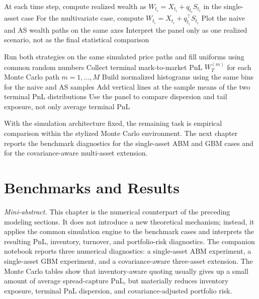 \documentclass[a4paper,10pt,titlepage,oneside,openany]{book}
\theoremstyle{plain}\newtheorem{theorem}{Theorem}[chapter]
\theoremstyle{definition}\newtheorem{definition}{Definition}[chapter]
\theoremstyle{remark}\newtheorem{remark}{Remark}[chapter]
\newcommand{\miniabstract}[1]{%
\vspace{-2pt}
\begin{tcolorbox}[colback=gray!6,colframe=black!15,boxrule=0.3pt,arc=3pt,left=6pt,right=6pt,top=4pt,bottom=4pt]
\textit{Mini-abstract.} #1
\end{tcolorbox}
\vspace{-4pt}
}
\begin{document}
\begin{algorithm}[H]
\caption{Panel (c): Mark-to-market PnL}
\DontPrintSemicolon
{}
At each time step, compute realized wealth as $W_{t_i}=X_{t_i}+q_{t_i}S_{t_i}$ in the single-asset case\;
For the multivariate case, compute $W_{t_i}=X_{t_i}+q_{t_i}^{\top}S_{t_i}$\;
Plot the naive and AS wealth paths on the same axes\;
Interpret the panel only as one realized scenario, not as the final statistical comparison\;
\end{algorithm}

\begin{algorithm}[H]
\caption{Panel (d): Terminal PnL distribution}
\DontPrintSemicolon
{}
Run both strategies on the same simulated price paths and fill uniforms using common random numbers\;
Collect terminal mark-to-market PnL $W_T^{(m)}$ for each Monte Carlo path $m=1,\ldots,M$\;
Build normalized histograms using the same bins for the naive and AS samples\;
Add vertical lines at the sample means of the two terminal PnL distributions\;
Use the panel to compare dispersion and tail exposure, not only average terminal PnL\;
\end{algorithm}

With the simulation architecture fixed, the remaining task is empirical comparison within the stylized Monte Carlo environment. The next chapter reports the benchmark diagnostics for the single-asset ABM and GBM cases and for the covariance-aware multi-asset extension.

\chapter{Benchmarks and Results}
\miniabstract{This chapter is the numerical counterpart of the preceding modeling sections. It does not introduce a new theoretical mechanism; instead, it applies the common simulation engine to the benchmark cases and interprets the resulting PnL, inventory, turnover, and portfolio-risk diagnostics. The companion notebook reports three numerical diagnostics: a single-asset ABM experiment, a single-asset GBM experiment, and a covariance-aware three-asset extension. The Monte Carlo tables show that inventory-aware quoting usually gives up a small amount of average spread-capture PnL, but materially reduces inventory exposure, terminal PnL dispersion, and covariance-adjusted portfolio risk.}
\end{document}
